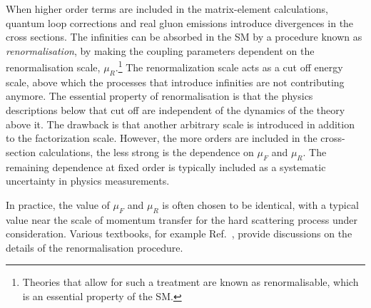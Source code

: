 When higher order terms are included in the matrix-element calculations, quantum loop corrections and real gluon emissions introduce divergences in the cross sections. 
The infinities can be absorbed in the SM by a procedure known as \emph{renormalisation}, by making the coupling parameters dependent on the renormalisation scale, $\mu_R$.\footnote{Theories that allow for such a treatment are known as renormalisable, which is an essential property of the SM.}
The renormalization scale acts as a cut off energy scale, above which the processes that introduce infinities are not contributing anymore. 
The essential property of renormalisation is that the physics descriptions below that cut off are independent of the dynamics of the theory above it. 
The drawback is that another arbitrary scale is introduced in addition to the factorization scale.
However, the more orders are included in the cross-section calculations, the less strong is the dependence on $\mu_F$ and $\mu_R$. 
The remaining dependence at fixed order is typically included as a systematic uncertainty in physics measurements.

In practice, the value of $\mu_F$ and $\mu_R$ is often chosen to be identical, with a typical value near the scale of momentum transfer for the hard scattering process under consideration.
Various textbooks, for example Ref.~\cite{Peskin:1995ev}, provide discussions on the details of the renormalisation procedure.

